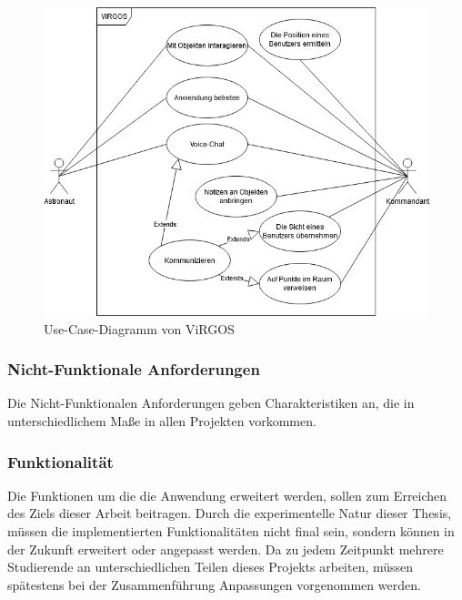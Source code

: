 \begin{figure}[H]
\centering
\includegraphics[width=1\textwidth]{ViRGOS_UseCase.png}
\caption{Use-Case-Diagramm von ViRGOS}
\end{figure}

\subsubsection{Nicht-Funktionale Anforderungen}
Die Nicht-Funktionalen Anforderungen geben Charakteristiken an, die in unterschiedlichem Maße in allen Projekten vorkommen.

\subsubsection*{Funktionalität}
Die Funktionen um die die Anwendung erweitert werden, sollen zum Erreichen des Ziels dieser Arbeit beitragen. Durch die experimentelle Natur dieser Thesis, müssen die implementierten Funktionalitäten nicht final sein, sondern können in der Zukunft erweitert oder angepasst werden. Da zu jedem Zeitpunkt mehrere Studierende an unterschiedlichen Teilen dieses Projekts arbeiten, müssen spätestens bei der Zusammenführung Anpassungen vorgenommen werden.

